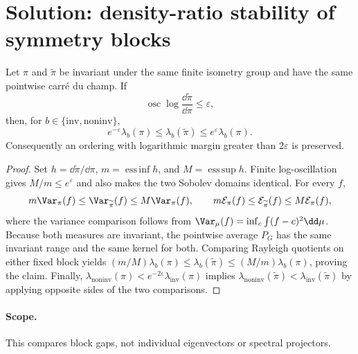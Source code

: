 \documentclass[../main.tex]{subfiles}
\begin{document}

\section*{Solution: density-ratio stability of symmetry blocks}

\begin{proposition}
Let $\pi$ and $\widetilde\pi$ be invariant under the same finite isometry group and have the
same pointwise carr\'e du champ. If
\[
 \operatorname*{osc}\log\frac{\dd\widetilde\pi}{\dd\pi}\le\varepsilon,
\]
then, for $b\in\{\mathrm{inv},\mathrm{noninv}\}$,
\[
 e^{-\varepsilon}\lambda_b(\pi)
 \le\lambda_b(\widetilde\pi)
 \le e^{\varepsilon}\lambda_b(\pi).
\]
Consequently an ordering with logarithmic margin greater than $2\varepsilon$ is preserved.
\end{proposition}

\begin{proof}
Set $h=\dd\widetilde\pi/\dd\pi$, $m=\operatorname*{ess\,inf}h$, and
$M=\operatorname*{ess\,sup}h$. Finite log-oscillation gives $M/m\le e^\varepsilon$ and also
makes the two Sobolev domains identical. For every $f$,
\[
 m\Var_\pi(f)\le\Var_{\widetilde\pi}(f)\le M\Var_\pi(f),
 \qquad
 m\mathcal E_\pi(f)\le\mathcal E_{\widetilde\pi}(f)\le M\mathcal E_\pi(f),
\]
where the variance comparison follows from
$\Var_\mu(f)=\inf_c\int(f-c)^2\dd\mu$. Because both measures are invariant, the pointwise
average $P_G$ has the same invariant range and the same kernel for both. Comparing Rayleigh
quotients on either fixed block yields
$(m/M)\lambda_b(\pi)\le\lambda_b(\widetilde\pi)\le(M/m)\lambda_b(\pi)$, proving the claim.
Finally,
$\lambda_{\mathrm{noninv}}(\pi)<e^{-2\varepsilon}\lambda_{\mathrm{inv}}(\pi)$ implies
$\lambda_{\mathrm{noninv}}(\widetilde\pi)<\lambda_{\mathrm{inv}}(\widetilde\pi)$ by applying
opposite sides of the two comparisons.
\end{proof}

\paragraph{Scope.}
This compares block gaps, not individual eigenvectors or spectral projectors.
\end{document}
